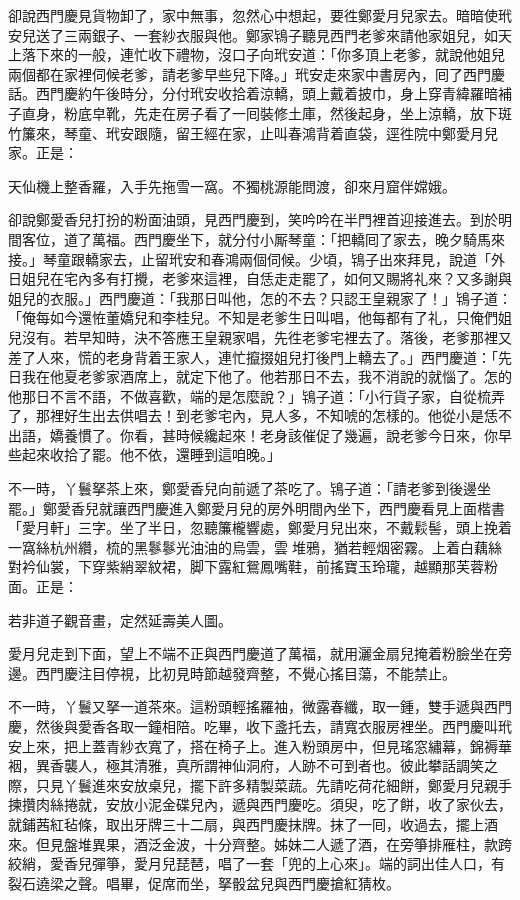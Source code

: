 卻說西門慶見貨物卸了，家中無事，忽然心中想起，要徃鄭愛月兒家去。暗暗使玳安兒送了三兩銀子、一套紗衣服與他。鄭家鴇子聽見西門老爹來請他家姐兒，如天上落下來的一般，連忙收下禮物，沒口子向玳安道：「你多頂上老爹，就說他姐兒兩個都在家裡伺候老爹，請老爹早些兒下降。」玳安走來家中書房內，囘了西門慶話。西門慶約午後時分，分付玳安收拾着涼轎，頭上戴着披巾，身上穿青緯羅暗補子直身，粉底皁靴，先走在房子看了一囘裝修土庫，然後起身，坐上涼轎，放下斑竹簾來，琴童、玳安跟隨，留王經在家，止叫春鴻背着直袋，逕徃院中鄭愛月兒家。正是：

天仙機上整香羅，入手先拖雪一窩。不獨桃源能問渡，卻來月窟伴嫦娥。

卻說鄭愛香兒打扮的粉面油頭，見西門慶到，笑吟吟在半門裡首迎接進去。到於明間客位，道了萬福。西門慶坐下，就分付小厮琴童：「把轎囘了家去，晚夕騎馬來接。」琴童跟轎家去，止留玳安和春鴻兩個伺候。少頃，鴇子出來拜見，說道「外日姐兒在宅內多有打攪，老爹來這裡，自恁走走罷了，如何又賜將礼來？又多謝與姐兒的衣服。」西門慶道：「我那日叫他，怎的不去？只認王皇親家了！」鴇子道：「俺每如今還恠董嬌兒和李桂兒。{}不知是老爹生日叫唱，他每都有了礼，只俺們姐兒沒有。若早知時，決不答應王皇親家唱，先徃老爹宅裡去了。落後，老爹那裡又差了人來，慌的老身背着王家人，連忙攛掇姐兒打後門上轎去了。」西門慶道：「先日我在他夏老爹家酒席上，就定下他了。他若那日不去，我不消說的就惱了。怎的他那日不言不語，不做喜歡，{}端的是怎麼說？」鴇子道：「小行貨子家，自從梳弄了，那裡好生出去供唱去！到老爹宅內，見人多，不知唬的怎樣的。他從小是恁不出語，嬌養慣了。{}你看，甚時候纔起來！老身該催促了幾遍，說老爹今日來，你早些起來收拾了罷。他不依，還睡到這咱晚。」

不一時，丫鬟拏茶上來，鄭愛香兒向前遞了茶吃了。鴇子道：「請老爹到後邊坐罷。」鄭愛香兒就讓西門慶進入鄭愛月兒的房外明間內坐下，西門慶看見上面楷書「愛月軒」三字。坐了半日，忽聽簾櫳響處，鄭愛月兒出來，不戴鬏髻，頭上挽着一窩絲杭州纘，梳的黑鬖鬖光油油的烏雲，雲𩬆堆鴉，猶若輕烟密霧。上着白藕絲對衿仙裳，下穿紫綃翠紋裙，脚下露紅鴛鳳嘴鞋，前搖寶玉玲瓏，越顯那芙蓉粉面。正是：

若非道子觀音畫，定然延壽美人圖。

愛月兒走到下面，望上不端不正與西門慶道了萬福，就用灑金扇兒掩着粉臉坐在旁邊。西門慶注目停視，比初見時節越發齊整，不覺心搖目蕩，不能禁止。

不一時，丫鬟又拏一道茶來。這粉頭輕搖羅袖，微露春纖，取一鍾，雙手遞與西門慶，然後與愛香各取一鐘相陪。吃畢，收下盞托去，請寬衣服房裡坐。西門慶叫玳安上來，把上蓋青紗衣寬了，搭在椅子上。{}進入粉頭房中，但見瑤窓繡幕，錦褥華裀，異香襲人，極其清雅，真所謂神仙洞府，人跡不可到者也。彼此攀話調笑之際，只見丫鬟進來安放桌兒，擺下許多精製菜蔬。先請吃荷花細餅，鄭愛月兒親手揀攢肉絲捲就，安放小泥金碟兒內，遞與西門慶吃。須臾，吃了餅，收了家伙去，就鋪茜紅毡條，取出牙牌三十二扇，與西門慶抹牌。抹了一囘，收過去，擺上酒來。但見盤堆異果，酒泛金波，十分齊整。姊妹二人遞了酒，在旁箏排雁柱，款跨絞綃，愛香兒彈箏，愛月兒琵琶，唱了一套「兜的上心來」。{}端的詞出佳人口，有裂石遶梁之聲。唱畢，促席而坐，拏骰盆兒與西門慶搶紅猜枚。


